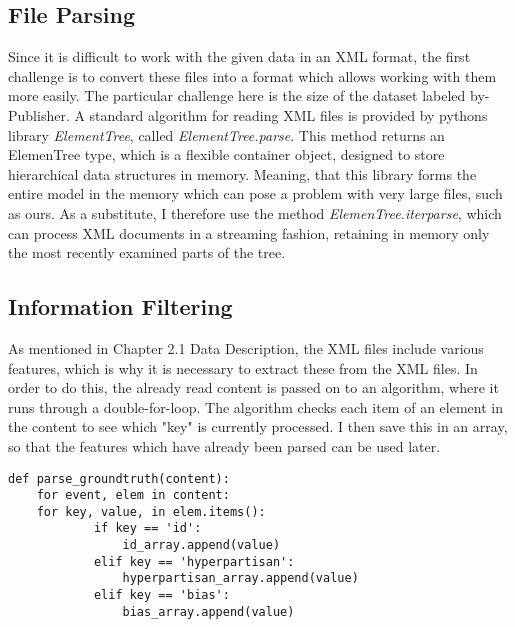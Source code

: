 \documentclass[a4paper, 11pt,titlepage,oneside,openany]{book}
\begin{document}
\newpage
\subsection{File Parsing}
Since it is difficult to work with the given data in an XML format, the first challenge is to convert these files into a format which allows working with them more easily. The particular challenge here is the size of the dataset labeled by-Publisher. A standard algorithm for reading XML files is provided by pythons library \textit{ElementTree}, called \textit{ElementTree.parse}\cite{parse}. This method returns an ElemenTree type, which is a flexible container object, designed to store hierarchical data structures in memory. Meaning, that this library forms the entire model in the memory which can pose a problem with very large files, such as ours. As a substitute, I therefore use the method \textit{ElemenTree.iterparse}, which can process XML documents in a streaming fashion, retaining in memory only the most recently examined parts of the tree\cite{iterparse}. 


\subsection{Information Filtering}
As mentioned in Chapter 2.1 Data Description, the XML files include various features, which is why it is necessary to extract these from the XML files. In order to do this, the already read content is passed on to an algorithm, where it runs through a double-for-loop. The algorithm checks each item of an element in the content to see which "key" is currently processed. I then save this in an array, so that the features which have already been parsed can be used later. 

\begin{lstlisting}[caption=Parse Ground-Truth File]
def parse_groundtruth(content):
    for event, elem in content:
 	for key, value, in elem.items():
            if key == 'id':
                id_array.append(value)
            elif key == 'hyperpartisan':
                hyperpartisan_array.append(value)
            elif key == 'bias':
                bias_array.append(value)
\end{lstlisting}
\newpage 
\end{document}
